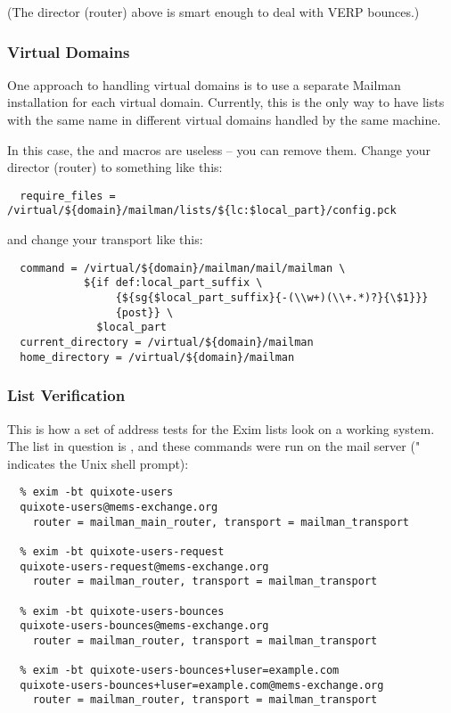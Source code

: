 \documentclass{howto}
\begin{document}
(The director (router) above is smart enough to deal with VERP bounces.)

\subsubsection{Virtual Domains}

One approach to handling virtual domains is to use a separate Mailman
installation for each virtual domain.  Currently, this is the only way to have
lists with the same name in different virtual domains handled by the same
machine.

In this case, the  and  macros are useless
-- you can remove them.  Change your director (router) to something like this:

\begin{verbatim}
  require_files = /virtual/${domain}/mailman/lists/${lc:$local_part}/config.pck
\end{verbatim}

and change your transport like this:

\begin{verbatim}
  command = /virtual/${domain}/mailman/mail/mailman \
            ${if def:local_part_suffix \
                 {${sg{$local_part_suffix}{-(\\w+)(\\+.*)?}{\$1}}}
                 {post}} \
              $local_part
  current_directory = /virtual/${domain}/mailman
  home_directory = /virtual/${domain}/mailman
\end{verbatim}

\subsubsection{List Verification}

This is how a set of address tests for the Exim lists look on a working
system.  The list in question is , and
these commands were run on the  mail server ("%
indicates the Unix shell prompt):

\begin{verbatim}
  % exim -bt quixote-users
  quixote-users@mems-exchange.org
    router = mailman_main_router, transport = mailman_transport

  % exim -bt quixote-users-request
  quixote-users-request@mems-exchange.org
    router = mailman_router, transport = mailman_transport

  % exim -bt quixote-users-bounces
  quixote-users-bounces@mems-exchange.org
    router = mailman_router, transport = mailman_transport

  % exim -bt quixote-users-bounces+luser=example.com
  quixote-users-bounces+luser=example.com@mems-exchange.org
    router = mailman_router, transport = mailman_transport
\end{verbatim}
\end{document}

